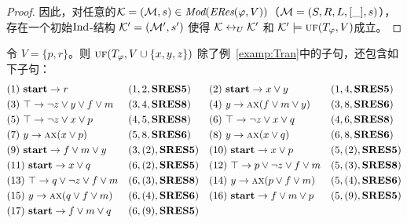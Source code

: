 \begin{proof}
	因此，对任意的${\cal K}=({\cal M}, s)\in \textit{Mod}(\emph{ERes}(\varphi,V))$（${\cal M}=(S, R, L, [\_], s)$），存在一个初始$\textrm{Ind}$-结构 ${\cal K}'=({\cal M}', s')$ 使得 ${\cal K} \leftrightarrow_{U} {\cal K}'$ 和 ${\cal K}' \models \textsc{uf}(T_\varphi,V)$成立。
\end{proof}


	\begin{example}\label{examp:Res}
	令 $V=\{p,r\}$。则  $\textsc{uf}(T_\varphi, V\cup \{x,y,z\})$ 除了例~\ref{examp:Tran}中的子句，还包含如下子句：
	\begin{align*}
		&(1)\ \textbf{start} \rightarrow r && (1,2,\textbf{SRES5})
		&&(2)\ \textbf{start} \rightarrow x \vee y && (1,4,\textbf{SRES5})\\
		&(3)\ \top \rightarrow \neg z \vee y \vee f \vee m && (3, 4, \textbf{SRES8})
		&&(4)\ y \rightarrow \textsc{a}\textsc{x}(f\vee m\vee y) && (3,8, \textbf{SRES6})\\
		&(5)\ \top \rightarrow \neg z \vee x \vee p && (4,5, \textbf{SRES8})
		&&(6)\ \top \rightarrow \neg z \vee x \vee q && (4,6, \textbf{SRES8})\\
		&(7)\ y \rightarrow \textsc{a}\textsc{x}(x\vee p) && (5, 8, \textbf{SRES6})
		&&(8)\ y \rightarrow \textsc{a}\textsc{x}(x\vee q) && (6, 8, \textbf{SRES6})\\
		&(9)\ \textbf{start} \rightarrow f\vee m \vee y && (3,(2), \textbf{SRES5})
		&&(10)\ \textbf{start} \rightarrow x \vee p && (5,(2),\textbf{SRES5}) \\
		&(11)\ \textbf{start} \rightarrow x \vee q && (6,(2), \textbf{SRES5})
		&& (12)\ \top \rightarrow p \vee \neg z \vee f \vee m && (5,(3), \textbf{SRES8})\\
		& (13)\ \top \rightarrow q \vee \neg z \vee f \vee m && (6,(3), \textbf{SRES8})
		&&(14)\ y \rightarrow \textsc{a}\textsc{x}(p \vee f\vee m) && (5, (4), \textbf{SRES6})\\
		&(15)\ y \rightarrow \textsc{a}\textsc{x}(q \vee f\vee m) && (6, (4), \textbf{SRES6})
		&&(16)\ \textbf{start} \rightarrow f\vee m \vee p && (5, (9), \textbf{SRES5}) \\
		&(17)\ \textbf{start} \rightarrow f\vee m \vee q && (6, (9), \textbf{SRES5})
	\end{align*}
	

\end{example}
